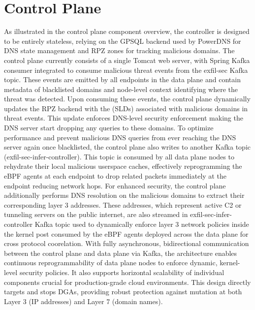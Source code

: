 \documentclass [11pt, proquest] {uwthesis}[2020/02/24]
\begin{document}
\section{Control Plane}
As illustrated in the control plane component overview, the controller is designed to be entirely stateless, relying on the GPSQL backend used by PowerDNS for DNS state management and RPZ zones for tracking malicious domains. The control plane currently consists of a single Tomcat web server, with Spring Kafka consumer integrated to consume malicious threat events from the exfil-sec Kafka topic. These events are emitted by all endpoints in the data plane and contain metadata of blacklisted domains and node-level context identifying where the threat was detected. Upon consuming these events, the control plane dynamically updates the RPZ backend with the (SLDs) associated with malicious domains in threat events. This update enforces DNS-level security enforcement making the DNS server start dropping any queries to these domains. To optimize performance and prevent malicious DNS queries from ever reaching the DNS server again once blacklisted, the control plane also writes to another Kafka topic (exfil-sec-infer-controller). This topic is consumed by all data plane nodes to rehydrate their local malicious userspace caches, effectively reprogramming the eBPF agents at each endpoint to drop related packets immediately at the endpoint reducing network hops. For enhanced security, the control plane additionally performs DNS resolution on the malicious domains to extract their corresponding layer 3 addresses. These addresses, which  represent active C2 or tunneling servers on the public internet, are also streamed in exfil-sec-infer-controller Kafka topic used to dynamically enforce layer 3 network policies inside the kernel post consumed by the eBPF agents deployed across the data plane for cross protocol coorelation. With fully asynchronous, bidirectional communication between the control plane and data plane via Kafka, the architecture enables continuous reprogrammability of data plane nodes to enforce dynamic, kernel-level security policies. It also supports horizontal scalability of individual components crucial for production-grade cloud environments. This design directly targets and stops DGAs, providing robust protection against mutation at both Layer 3 (IP addresses) and Layer 7 (domain names).
\end{document}
